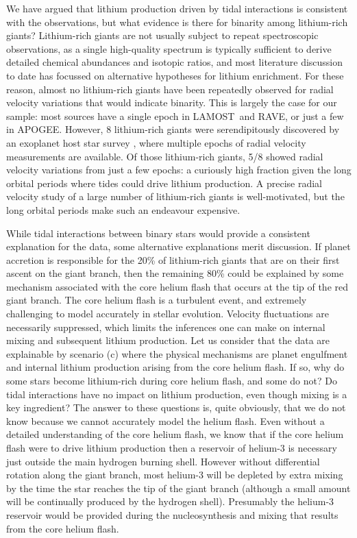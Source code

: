\documentclass[twocolumn]{aastex62}
\newcommand\lamost{LAMOST}
\newcommand\apogee{APOGEE}
\newcommand\rave{RAVE}
\begin{document}
We have argued that lithium production driven by tidal interactions is consistent
with the observations, but what evidence is there for binarity among lithium-rich
giants? Lithium-rich giants are not usually subject to repeat spectroscopic observations,
as a single high-quality spectrum is typically sufficient to derive detailed chemical
abundances and isotopic ratios, and most literature discussion to date has focussed 
on alternative hypotheses for lithium enrichment. For these reason, almost no 
lithium-rich giants have been repeatedly observed for radial velocity variations that would indicate binarity. This is largely the case for our sample: most sources have a single
epoch in \lamost\ and \rave, or just a few in \apogee. 
However, 8 lithium-rich giants were serendipitously discovered by an
exoplanet host star survey \citep{Adamow_2015}, where multiple epochs of radial velocity measurements are available. Of those lithium-rich giants, 5/8 showed radial velocity
variations from just a few epochs: a curiously high fraction given the long orbital periods
where tides could drive lithium production.
A precise radial velocity study of a large number of lithium-rich giants 
is well-motivated, but the long orbital periods make such an endeavour expensive.

While tidal interactions between binary stars would provide a consistent explanation
for the data, some alternative explanations merit discussion. If planet accretion is
responsible for the 20\% of lithium-rich giants that are on their first ascent on the
giant branch, then the remaining 80\% could be explained by some mechanism associated
with the core helium flash that occurs at the tip of the red giant branch. The core
helium flash is a turbulent event, and extremely challenging to model accurately in
stellar evolution. Velocity fluctuations are necessarily suppressed, which limits
the inferences one can make on internal mixing and subsequent lithium production.
Let us consider that the data are explainable by scenario (c) where the 
physical mechanisms are planet engulfment and internal lithium production arising
from the core helium flash. If so, why do some stars become lithium-rich during
core helium flash, and some do not? Do tidal interactions have no impact on lithium
production, even though mixing is a key ingredient?
The answer to these questions is, quite obviously, that we do not
know because we cannot accurately model the helium flash. Even without a detailed
understanding of the core helium flash, we know that if the core helium flash were
to drive lithium production then a reservoir of helium-3 is necessary just outside the main hydrogen burning shell. However without differential rotation along the giant branch, most helium-3 will be depleted by extra mixing by the time the star reaches the tip of the giant branch (although a small amount will be continually produced by the hydrogen shell).
Presumably the helium-3 reservoir would be provided during the nucleosynthesis and mixing 
that results from the core helium flash. 
\end{document}
